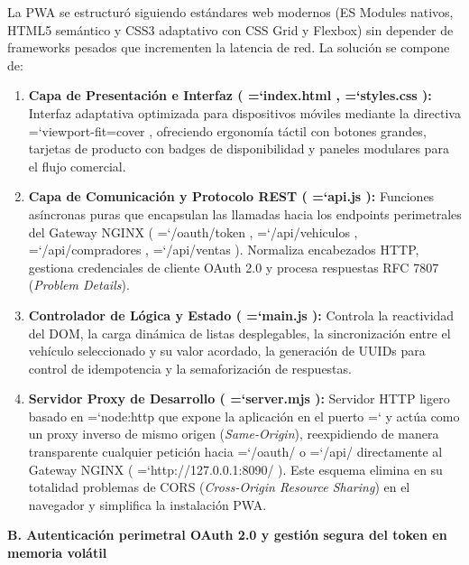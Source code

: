 \documentclass[11pt,a4paper]{article}
\renewcommand{\_}{\oldunderscore\allowbreak}
\DeclareRobustCommand{\texttt}[1]{%
  {\upshape\ttfamily\fontsize{9}{10.8}\selectfont\hyphenchar\font=`\-\relax #1}%
}
\begin{document}
\noindent La PWA se estructuró siguiendo estándares web modernos (ES Modules nativos, HTML5 semántico y CSS3 adaptativo con CSS Grid y Flexbox) sin depender de frameworks pesados que incrementen la latencia de red. La solución se compone de:
\begin{enumerate}[leftmargin=*,itemsep=2pt,topsep=1pt]
  \item \textbf{Capa de Presentación e Interfaz (\texttt{index.html}, \texttt{styles.css}):} Interfaz adaptativa optimizada para dispositivos móviles mediante la directiva \texttt{viewport-fit=\allowbreak{}cover}, ofreciendo ergonomía táctil con botones grandes, tarjetas de producto con badges de disponibilidad y paneles modulares para el flujo comercial.
  \item \textbf{Capa de Comunicación y Protocolo REST (\texttt{api.js}):} Funciones asíncronas puras que encapsulan las llamadas hacia los endpoints perimetrales del Gateway NGINX (\texttt{/\allowbreak{}oauth/\allowbreak{}token}, \texttt{/\allowbreak{}api/\allowbreak{}vehiculos}, \texttt{/\allowbreak{}api/\allowbreak{}compradores}, \texttt{/api/ventas}). Normaliza encabezados HTTP, gestiona credenciales de cliente OAuth 2.0 y procesa respuestas RFC 7807 (\textit{Problem Details}).
  \item \textbf{Controlador de Lógica y Estado (\texttt{main.js}):} Controla la reactividad del DOM, la carga dinámica de listas desplegables, la sincronización entre el vehículo seleccionado y su valor acordado, la generación de UUIDs para control de idempotencia y la semaforización de respuestas.
  \item \textbf{Servidor Proxy de Desarrollo (\texttt{server.mjs}):} Servidor HTTP ligero basado en \texttt{node:http} que expone la aplicación en el puerto \texttt{5173} y actúa como un proxy inverso de mismo origen (\textit{Same-Origin}), reexpidiendo de manera transparente cualquier petición hacia \texttt{/oauth/} o \texttt{/api/} directamente al Gateway NGINX (\texttt{http:\allowbreak{}/\allowbreak{}/\allowbreak{}127.\allowbreak{}0.\allowbreak{}0.\allowbreak{}1:\allowbreak{}8090/}). Este esquema elimina en su totalidad problemas de CORS (\textit{Cross-Origin Resource Sharing}) en el navegador y simplifica la instalación PWA.
\end{enumerate}

\vspace{0.2cm}
\noindent\textbf{B. Autenticación perimetral OAuth 2.0 y gestión segura del token en memoria volátil}
\end{document}
